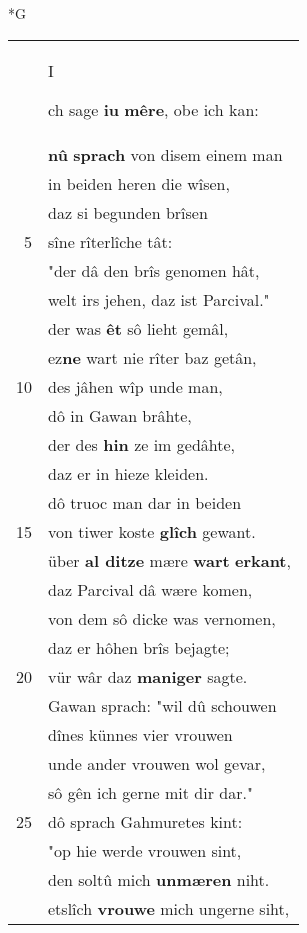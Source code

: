 \documentclass[8pt,a4paper,notitlepage]{article}
\begin{document}
\begin{table}[ht]
\begin{minipage}[t]{0.5\linewidth}
\small
\begin{center}*G
\end{center}
\begin{tabular}{rl}
 & \begin{large}I\end{large}ch sage \textbf{iu} \textbf{mêre}, obe ich kan:\\ 
 & \textbf{nû} \textbf{sprach} von disem einem man\\ 
 & in beiden heren die wîsen,\\ 
 & daz si begunden brîsen\\ 
5 & sîne rîterlîche tât:\\ 
 & "der dâ den brîs genomen hât,\\ 
 & welt irs jehen, daz ist Parcival."\\ 
 & der was \textbf{êt} sô lieht gemâl,\\ 
 & ez\textbf{ne} wart nie rîter baz getân,\\ 
10 & des jâhen wîp unde man,\\ 
 & dô in Gawan brâhte,\\ 
 & der des \textbf{hin} ze im gedâhte,\\ 
 & daz er in hieze kleiden.\\ 
 & dô truoc man dar in beiden\\ 
15 & von tiwer koste \textbf{glîch} gewant.\\ 
 & über \textbf{al ditze} mære \textbf{wart} \textbf{erkant},\\ 
 & daz Parcival dâ wære komen,\\ 
 & von dem sô dicke was vernomen,\\ 
 & daz er hôhen brîs bejagte;\\ 
20 & vür wâr daz \textbf{maniger} sagte.\\ 
 & Gawan sprach: "wil dû schouwen\\ 
 & dînes künnes vier vrouwen\\ 
 & unde ander vrouwen wol gevar,\\ 
 & sô gên ich gerne mit dir dar."\\ 
25 & dô sprach Gahmuretes kint:\\ 
 & "op hie werde vrouwen sint,\\ 
 & den soltû mich \textbf{unmæren} niht.\\ 
 & etslîch \textbf{vrouwe} mich ungerne siht,\\ 

\end{tabular}
\end{minipage}
\end{table}
\end{document}
